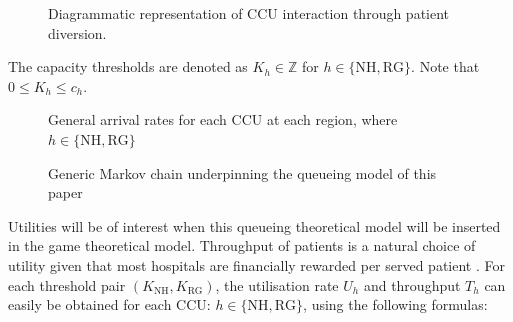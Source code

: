 \documentclass[a4paper,11pt]{article}
\newcommand{\NH}{\text{NH}}
\newcommand{\RG}{\text{RG}}
\begin{document}
\begin{figure}[!htbp]
\begin{center}
\caption{Diagrammatic representation of CCU interaction through patient diversion.}\label{diagramofdiversion}
\end{center}
\end{figure}

The capacity thresholds are denoted as $K_{h}\in\mathbb{Z}$ for $h\in\{\NH,\RG\}$. Note that $0\leq K_h\leq c_h$.

\begin{figure}[!htbp]
\begin{center}
\caption{General arrival rates for each CCU at each region, where $h\in\{\NH, \RG\}$} \label{arrivalrateregions}
\end{center}
\end{figure}

\begin{figure}[!htbp]
\begin{center}

\caption{Generic Markov chain underpinning the queueing model of this paper} \label{mc}
\end{center}
\end{figure}

Utilities will be of interest when this queueing theoretical model will be inserted in the game theoretical model.
Throughput of patients is a natural choice of utility given that most hospitals are financially rewarded per served patient \cite{Pate2009}.
For each threshold pair $(K_{\NH},K_{\RG})$, the utilisation rate $U_h$ and throughput $T_h$ can easily be obtained for each CCU: $h\in\{\text{NH},\text{RG}\}$, using the following formulas:
\end{document}
